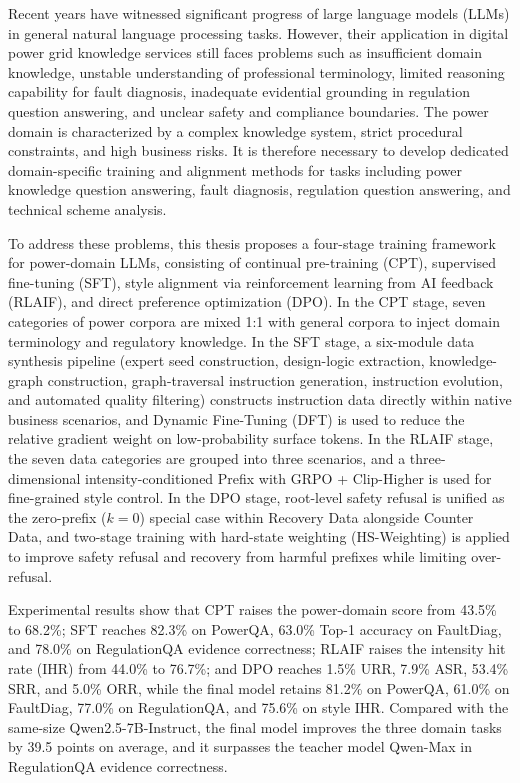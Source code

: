 \documentclass[fontset=fandol,type=master,campus=shenzhen,etitleauto=true]{hithesisbook}
\begin{document}
\begin{eabstract}
Recent years have witnessed significant progress of large language models (LLMs) in general natural language processing tasks. However, their application in digital power grid knowledge services still faces problems such as insufficient domain knowledge, unstable understanding of professional terminology, limited reasoning capability for fault diagnosis, inadequate evidential grounding in regulation question answering, and unclear safety and compliance boundaries. The power domain is characterized by a complex knowledge system, strict procedural constraints, and high business risks. It is therefore necessary to develop dedicated domain-specific training and alignment methods for tasks including power knowledge question answering, fault diagnosis, regulation question answering, and technical scheme analysis.

To address these problems, this thesis proposes a four-stage training framework for power-domain LLMs, consisting of continual pre-training (CPT), supervised fine-tuning (SFT), style alignment via reinforcement learning from AI feedback (RLAIF), and direct preference optimization (DPO). In the CPT stage, seven categories of power corpora are mixed 1:1 with general corpora to inject domain terminology and regulatory knowledge. In the SFT stage, a six-module data synthesis pipeline (expert seed construction, design-logic extraction, knowledge-graph construction, graph-traversal instruction generation, instruction evolution, and automated quality filtering) constructs instruction data directly within native business scenarios, and Dynamic Fine-Tuning (DFT) is used to reduce the relative gradient weight on low-probability surface tokens. In the RLAIF stage, the seven data categories are grouped into three scenarios, and a three-dimensional intensity-conditioned Prefix with GRPO + Clip-Higher is used for fine-grained style control. In the DPO stage, root-level safety refusal is unified as the zero-prefix ($k=0$) special case within Recovery Data alongside Counter Data, and two-stage training with hard-state weighting (HS-Weighting) is applied to improve safety refusal and recovery from harmful prefixes while limiting over-refusal.

Experimental results show that CPT raises the power-domain score from 43.5\% to 68.2\%; SFT reaches 82.3\% on PowerQA, 63.0\% Top-1 accuracy on FaultDiag, and 78.0\% on RegulationQA evidence correctness; RLAIF raises the intensity hit rate (IHR) from 44.0\% to 76.7\%; and DPO reaches 1.5\% URR, 7.9\% ASR, 53.4\% SRR, and 5.0\% ORR, while the final model retains 81.2\% on PowerQA, 61.0\% on FaultDiag, 77.0\% on RegulationQA, and 75.6\% on style IHR. Compared with the same-size Qwen2.5-7B-Instruct, the final model improves the three domain tasks by 39.5 points on average, and it surpasses the teacher model Qwen-Max in RegulationQA evidence correctness.
\end{eabstract}
\end{document}
